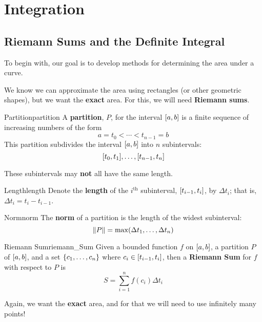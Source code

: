 \chapter{Integration}
\setcounter{section}{1}
\section{Riemann Sums and the Definite Integral}
To begin with, our goal is to develop methods for determining the area under a curve.

We know we can approximate the area using rectangles (or other geometric shapes), but
we want the \textbf{exact} area. For this, we will need \textbf{Riemann sums}.

\begin{Definition}{Partition}{partition}
    A \textbf{partition}, $P$, for the interval $ \interval{a}{b} $ is a finite
    sequence of increasing numbers of the form
    \[ a=t_0<\cdots<t_{n-1}=b \]
    This partition subdivides the interval $ \interval{a}{b} $ into $ n $ subintervals:
    \[ \interval{t_0}{t_1},\ldots,\interval{t_{n-1}}{t_n} \]
\end{Definition}

\begin{Remark}{}{}
    These subintervals may \textbf{not} all have the same length.
\end{Remark}

\begin{Definition}{Length}{length}
    Denote the \textbf{length} of the $ i^{\text{th}} $ subinterval,
    $ \interval{t_{i-1}}{t_i} $, by $ \Delta t_i $; that is, $ \Delta t_i=t_i-t_{i-1} $.
\end{Definition}

\begin{Definition}{Norm}{norm}
    The \textbf{norm} of a partition is the length of the widest subinterval:
    \[ \lVert P\rVert=\max(\Delta t_1,\dots,\Delta t_{n}) \]
\end{Definition}

\begin{Definition}{Riemann Sum}{riemann_Sum}
    Given a bounded function $ f $ on $ \interval{a}{b} $,
    a partition $ P $ of $ \interval{a}{b} $, and a set
    $ \{c_1,\dots,c_n\} $ where $ c_i\in\interval{t_{i-1}}{t_i} $, then a
    \textbf{Riemann Sum} for $ f $ with respect to $ P $ is
    \[ S=\sum\limits_{i=1}^{n} f(c_i)\Delta t_i \]
\end{Definition}

Again, we want the \textbf{exact} area, and for that we will need to use infinitely
many points!


